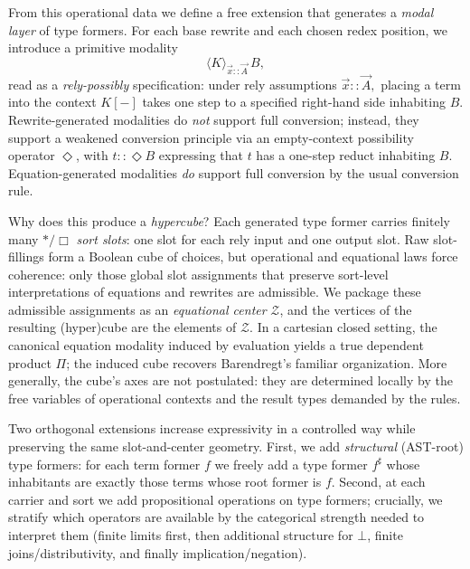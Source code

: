 \documentclass[11pt]{article}
\theoremstyle{definition}
\theoremstyle{plain}
\theoremstyle{remark}
\theoremstyle{plain}
\newcommand{\angles}[3]{\langle #1 \rangle_{#2}\,#3}
\newcommand{\Boxsort}{\Box}
\newcommand{\astsort}{\ast}
\begin{document}
From this operational data we define a free extension that generates a \emph{modal layer} of type formers\cite{AbelCoquand2005, AltenkirchDanielssonLohOury2010}.  For each base rewrite and each chosen redex position, we introduce a primitive modality
\[
  \angles{K}{\vec{x}::\vec{A}}{B},
\]
read as a \emph{rely-possibly} specification: under rely assumptions $\vec x::\vec A,$ placing a term into the context $K[-]$ takes one step to a specified right-hand side inhabiting $B$.  Rewrite-generated modalities do \emph{not} support full conversion; instead, they support a weakened conversion principle via an empty-context possibility operator $\Diamond$, with $t::\Diamond B$ expressing that $t$ has a one-step reduct inhabiting $B$.  Equation-generated modalities \emph{do} support full conversion by the usual conversion rule.

Why does this produce a \emph{hypercube}?  Each generated type former carries finitely many $\astsort/\Boxsort$ \emph{sort slots}: one slot for each rely input and one output slot.  Raw slot-fillings form a Boolean cube of choices, but operational and equational laws force coherence: only those global slot assignments that preserve sort-level interpretations of equations and rewrites are admissible.  We package these admissible assignments as an \emph{equational center} $\mathcal{Z}$, and the vertices of the resulting (hyper)cube are the elements of $\mathcal{Z}$.  In a cartesian closed setting, the canonical equation modality induced by evaluation yields a true dependent product $\Pi$; the induced cube recovers Barendregt’s familiar organization.  More generally, the cube’s axes are not postulated: they are determined locally by the free variables of operational contexts and the result types demanded by the rules.

Two orthogonal extensions increase expressivity in a controlled way while preserving the same slot-and-center geometry.  First, we add \emph{structural} (AST-root) type formers: for each term former $f$ we freely add a type former $f^\sharp$ whose inhabitants are exactly those terms whose root former is $f$.  Second, at each carrier and sort we add propositional operations on type formers; crucially, we stratify which operators are available by the categorical strength needed to interpret them (finite limits first, then additional structure for $\bot$, finite joins/distributivity, and finally implication/negation).
\end{document}
